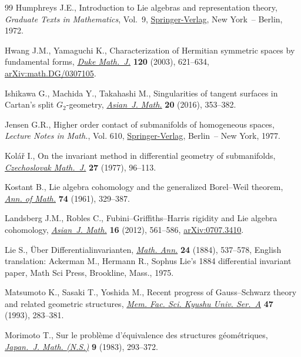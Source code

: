 \documentclass[10pt,a4paper]{amsart}
\numberwithin{equation}{section}
\begin{document}
\begin{thebibliography}{99}
Humphreys J.E., Introduction to {L}ie algebras and representation theory,
 \textit{Graduate Texts in Mathematics}, Vol.~9, \href{https://doi.org/10.1007/978-1-4612-6398-2}{Springer-Verlag}, New York~--
 Berlin, 1972.

Hwang J.M., Yamaguchi K., Characterization of {H}ermitian symmetric spaces by
 fundamental forms, \href{https://doi.org/10.1215/S0012-7094-03-12035-9}{\textit{Duke Math.~J.}} \textbf{120} (2003), 621--634,
 \href{https://arxiv.org/abs/math.DG/0307105}{arXiv:math.DG/0307105}.

Ishikawa G., Machida Y., Takahashi M., Singularities of tangent surfaces in
 {C}artan's split {$G_2$}-geometry, \href{https://doi.org/10.4310/AJM.2016.v20.n2.a6}{\textit{Asian~J. Math.}} \textbf{20}
 (2016), 353--382.

Jensen G.R., Higher order contact of submanifolds of homogeneous spaces,
 \textit{Lecture Notes in Math.}, Vol. 610, \href{https://doi.org/10.1007/BFb0068415}{Springer-Verlag}, Berlin~-- New
 York, 1977.

Kol\'a\v{r} I., On the invariant method in differential geometry of
 submanifolds, \href{https://doi.org/10.21136/CMJ.1977.101448}{\textit{Czechoslovak Math.~J.}} \textbf{27} (1977), 96--113.

Kostant B., Lie algebra cohomology and the generalized {B}orel--{W}eil theorem,
 \href{https://doi.org/10.2307/1970237}{\textit{Ann. of Math.}} \textbf{74} (1961), 329--387.

Landsberg J.M., Robles C., Fubini--{G}riffiths--{H}arris rigidity and {L}ie
 algebra cohomology, \href{https://doi.org/10.4310/AJM.2012.v16.n4.a1}{\textit{Asian~J. Math.}} \textbf{16} (2012), 561--586,
 \href{https://arxiv.org/abs/0707.3410}{arXiv:0707.3410}.

Lie S., \"Uber Differentialinvarianten, \href{https://doi.org/10.1007/BF01447449}{\textit{Math. Ann.}} \textbf{24} (1884),
 537--578, {E}nglish translation: Ackerman M., Hermann R., Sophus Lie's 1884
 differential invariant paper, Math Sci Press, Brookline, Mass., 1975.

Matsumoto K., Sasaki T., Yoshida M., Recent progress of {G}auss--{S}chwarz
 theory and related geometric structures, \href{https://doi.org/10.2206/kyushumfs.47.283}{\textit{Mem. Fac. Sci. Kyushu Univ.
 Ser.~A}} \textbf{47} (1993), 283--381.

Morimoto T., Sur le probl\`eme d'\'equivalence des structures g\'eom\'etriques,
 \href{https://doi.org/10.4099/math1924.9.293}{\textit{Japan.~J. Math. (N.S.)}} \textbf{9} (1983), 293--372.


\end{thebibliography}
\end{document}
